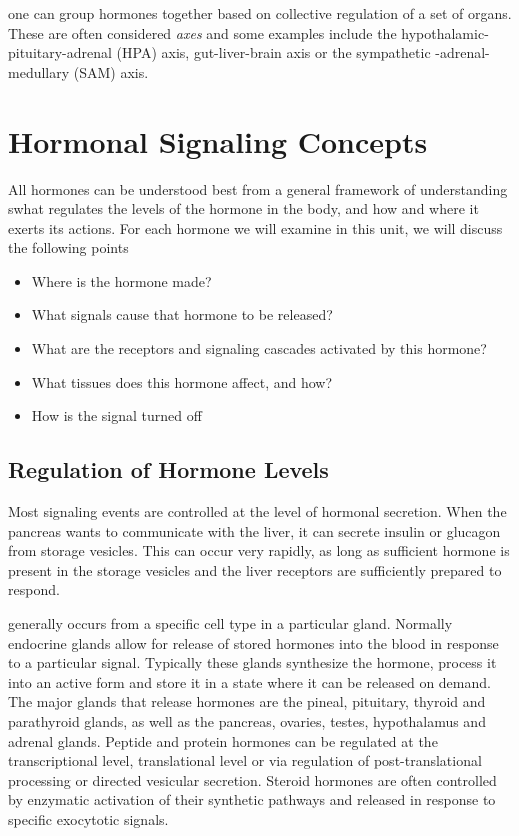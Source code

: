 \documentclass{tufte-handout}
\begin{document}
 one can group hormones together based on collective regulation  of a set of organs.  These are often considered \emph{axes} and some examples include the hypothalamic-pituitary-adrenal (HPA) axis, gut-liver-brain axis or the sympathetic -adrenal-medullary (SAM) axis. 

\section{Hormonal Signaling Concepts}

All hormones can be understood best from a general framework of understanding swhat regulates the levels of the hormone in the body, and how and where it exerts its actions.  For each hormone we will examine in this unit, we will discuss the following points

\begin{itemize}
\item Where is the hormone made?
\item What signals cause that hormone to be released?
\item What are the receptors and signaling cascades activated by this hormone?
\item What tissues does this hormone affect, and how?
\item How is the signal turned off
\end{itemize}

\subsection{Regulation of Hormone Levels}

Most signaling events are controlled at the level of hormonal secretion.  When the pancreas wants to communicate with the liver, it can secrete insulin or glucagon from storage vesicles.  This can occur very rapidly, as long as sufficient hormone is present in the storage vesicles and the liver receptors are sufficiently prepared to respond.

 generally occurs from a specific cell type in a particular gland.  Normally endocrine glands allow for release of stored hormones into the blood in response to a particular signal.  Typically these glands synthesize the hormone, process it into an active form and store it in a state where it can be released on demand.  The major glands that release hormones are the pineal, pituitary, thyroid and parathyroid glands, as well as the pancreas, ovaries, testes, hypothalamus and adrenal glands.  Peptide and protein hormones can be regulated at the transcriptional level, translational level or via regulation of post-translational processing or directed vesicular secretion.  Steroid hormones are often controlled by enzymatic activation of their synthetic pathways and released in response to specific exocytotic signals.  
\end{document}
